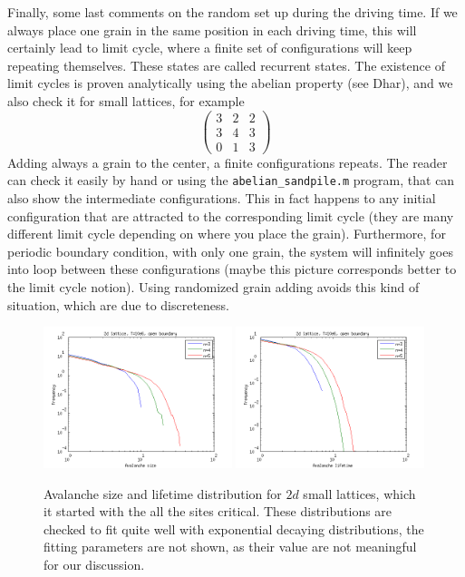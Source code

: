 Finally, some last comments on the random set up during the driving time. 
If we always place one grain in the same position in each driving time, 
this will certainly lead to limit cycle, where a finite set of configurations will keep repeating themselves. These states are called recurrent states.
The existence of limit cycles is proven analytically using the abelian property (see Dhar), and we also check it for small lattices, for example
\[ \left( \begin{array}{ccc}
3 & 2 & 2 \\
3 & 4 & 3 \\
0 & 1 & 3 \end{array} \right)\] 
Adding always a grain to the center, a finite configurations repeats. The reader can check it easily by hand or using the \texttt{abelian_sandpile.m} program, 
that can also show the intermediate configurations. This in fact happens to any initial configuration that are attracted to the corresponding limit cycle (they are many different limit cycle depending on where you place the grain).
Furthermore, for periodic boundary condition, with only one grain, the system will infinitely goes into loop between these configurations (maybe this picture corresponds better to the limit cycle notion).
Using randomized grain adding avoids this kind of situation, which are due to discreteness. 





\begin{figure} 
\begin{center}
\includegraphics[width=0.49\textwidth]{results/smulti.png}
\includegraphics[width=0.49\textwidth]{results/tmulti.png}
\caption{Avalanche size and lifetime distribution for $2d$ small lattices, 
which it started with the all the sites critical. 
These distributions are checked to fit quite well with exponential decaying distributions,
the fitting parameters are not shown, as their value are not meaningful for our discussion.}
\label{multi}
\end{center}
\end{figure} 


